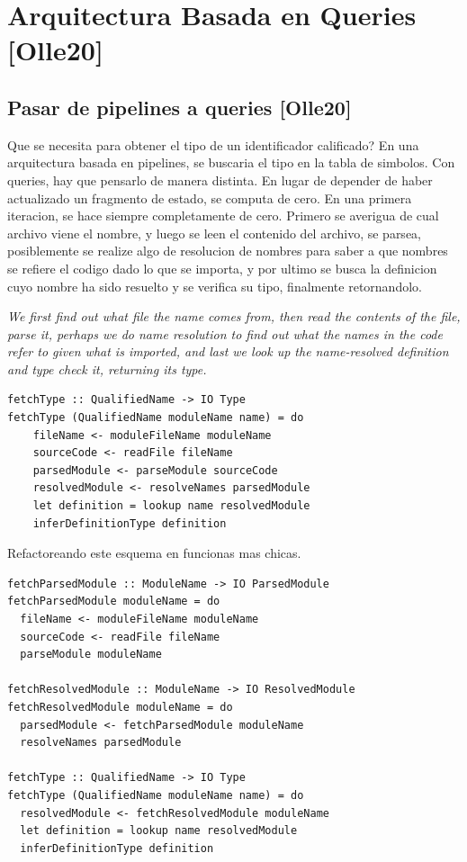 \documentclass[12pt, a4paper]{report}
\begin{document}
\section*{Arquitectura Basada en Queries [Olle20]}

\subsection*{Pasar de pipelines a queries [Olle20]}

Que se necesita para obtener el tipo de un identificador calificado?
En una arquitectura basada en pipelines, se buscaria el tipo en la tabla de simbolos.
Con queries, hay que pensarlo de manera distinta.
En lugar de depender de haber actualizado un fragmento de estado, se computa de cero.
En una primera iteracion, se hace siempre completamente de cero.
Primero se averigua de cual archivo viene el nombre, y luego se leen el contenido del archivo, se parsea, posiblemente se realize algo de resolucion de nombres para saber a que nombres se refiere el codigo dado lo que se importa, y por ultimo se busca la definicion cuyo nombre ha sido resuelto y se verifica su tipo, finalmente retornandolo.

\textit{We first find out what file the name comes from, then read the contents of the file, parse it, perhaps we do name resolution to find out what the names in the code refer to given what is imported, and last we look up the name-resolved definition and type check it, returning its type.}

\begin{verbatim}
fetchType :: QualifiedName -> IO Type
fetchType (QualifiedName moduleName name) = do
    fileName <- moduleFileName moduleName
    sourceCode <- readFile fileName
    parsedModule <- parseModule sourceCode
    resolvedModule <- resolveNames parsedModule
    let definition = lookup name resolvedModule
    inferDefinitionType definition
\end{verbatim}

Refactoreando este esquema en funcionas mas chicas.

\begin{verbatim}
fetchParsedModule :: ModuleName -> IO ParsedModule
fetchParsedModule moduleName = do
  fileName <- moduleFileName moduleName
  sourceCode <- readFile fileName
  parseModule moduleName

fetchResolvedModule :: ModuleName -> IO ResolvedModule
fetchResolvedModule moduleName = do
  parsedModule <- fetchParsedModule moduleName
  resolveNames parsedModule

fetchType :: QualifiedName -> IO Type
fetchType (QualifiedName moduleName name) = do
  resolvedModule <- fetchResolvedModule moduleName
  let definition = lookup name resolvedModule
  inferDefinitionType definition
\end{verbatim}
\end{document}
